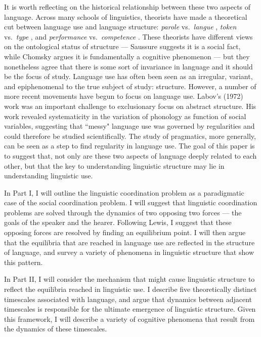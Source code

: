 \documentclass[man, noapacite, 12pt]{apa2}
\begin{document}
It is worth reflecting on the historical relationship between these two aspects of language. Across many schools of linguistics, theorists have made a theoretical cut between language use and language structure: {\it parole} vs.\  {\it langue}  \cite{saussure},  {\it token}  vs.\  {\it type}  \cite{peirce}, and  {\it performance}  vs.\  {\it competence}  \cite{chomsky1965aspects}. These theorists  have different views on the ontological status of structure --- Saussure suggests it is a social fact, while Chomsky argues it is fundamentally a cognitive phenomenon --- but they nonetheless agree that there is some sort of invariance in language and it should be the focus of study. Language use has often been seen as an irregular, variant, and epiphenomenal to the true subject of study: structure. However, a number of more recent movements have begun to focus on language use. \nocite{labov197213} Labov's (1972) work was an important challenge to exclusionary focus on abstract structure. His work revealed systematicity in the variation of phonology as function of social variables, suggesting that ``messy" language use was governed by regularities and could therefore be studied scientifically. The study of pragmatics, more generally, can be seen as a step to find regularity in language use. The goal of this paper is to suggest that, not only are these two aspects of language deeply related to each other, but that the key to understanding linguistic structure may lie in understanding linguistic use.

In Part I, I will outline the linguistic coordination problem as a paradigmatic case of the social coordination problem. I will suggest that linguistic coordination problems are solved through the dynamics of two opposing two forces --- the goals of the speaker and the hearer. Following Lewis, I suggest that these opposing forces are resolved by finding an equilibrium point. I will then argue that the equilibria that are reached in language use are reflected in the structure of language, and survey a variety of phenomena in linguistic structure that show this pattern.

In Part II, I will consider the mechanism that might cause linguistic structure to reflect the equilibria reached in linguistic use. I describe five theoretically distinct timescales associated with language, and argue that dynamics between adjacent timescales is responsible for the ultimate emergence of linguistic structure. Given this framework, I will describe a variety of cognitive phenomena that result from the dynamics of these timescales.
\end{document}
